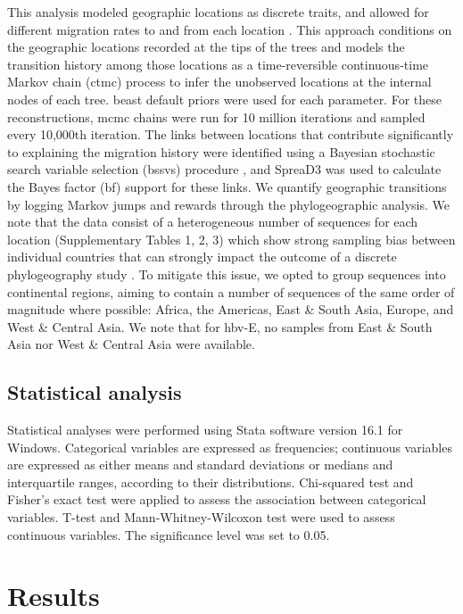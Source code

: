 This analysis modeled geographic locations as discrete traits, and allowed for different migration rates to and from each location \citep{lemey_bayesian_2009}.
This approach conditions on the geographic locations recorded at the tips of the trees and models the transition history among those locations as a time-reversible continuous-time Markov chain (\gls{ctmc}) process to infer the unobserved locations at the internal nodes of each tree.
\gls{beast} default priors were used for each parameter.
For these reconstructions, \gls{mcmc} chains were run for 10 million iterations and sampled every 10,000th iteration.
The links between locations that contribute significantly to explaining the migration history were identified using a Bayesian stochastic search variable selection (\gls{bssvs}) procedure \citep{lemey_bayesian_2009}, and SpreaD3 \citep{bielejec2016spread3} was used to calculate the Bayes factor (\gls{bf}) support for these links.
We quantify geographic transitions by logging Markov jumps and rewards through the phylogeographic analysis.
We note that the data consist of a heterogeneous number of sequences for each location (Supplementary Tables 1, 2, 3) which show strong sampling bias between individual countries that can strongly impact the outcome of a discrete phylogeography study \citep{maio_new_2015}.
To mitigate this issue, we opted to group sequences into continental regions, aiming to contain a number of sequences of the same order of magnitude where possible: Africa, the Americas, East \& South Asia, Europe, and West \& Central Asia.
We note that for \gls{hbv}-E, no samples from East \& South Asia nor West \& Central Asia were available.

\subsection{Statistical analysis}
Statistical analyses were performed using Stata software version 16.1 for Windows.
Categorical variables are expressed as frequencies; continuous variables are expressed as either means and standard deviations or medians and interquartile ranges, according to their distributions.
Chi-squared test and Fisher's exact test were applied to assess the association between categorical variables.
T-test and Mann-Whitney-Wilcoxon test were used to assess continuous variables.
The significance level was set to 0.05.


\section{Results}
